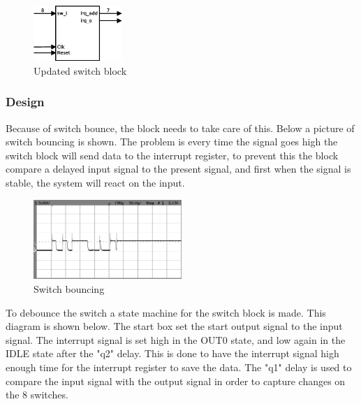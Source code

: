 \begin{figure}[H]
	\begin{centering}
		\includegraphics[width=0.3\textwidth]{images/tb6_switchblock.eps}
		\caption{Updated switch block}
	\end{centering}
\end{figure}


\subsubsection{Design}
%
%
Because of switch bounce, the block needs to take care of this. Below a picture of switch bouncing is shown. The problem is every time the signal goes high the switch block will send data to the interrupt register, to prevent this the block compare a delayed input signal to the present signal, and first when the signal is stable, the system will react on the input.

\begin{figure}[H]
	\begin{centering}
		\includegraphics[width=0.5\textwidth]{images/tb6_bounce.png}
		\caption{Switch bouncing}
	\end{centering}
\end{figure}

To debounce the switch a state machine for the switch block is made. This diagram is shown below. The start box set the start output signal to the input signal. The interrupt signal is set high in the OUT0 state, and low again in the IDLE state after the "q2" delay. This is done to have the interrupt signal high enough time for the interrupt register to save the data. The "q1" delay is used to compare the input signal with the output signal in order to capture changes on the 8 switches.

